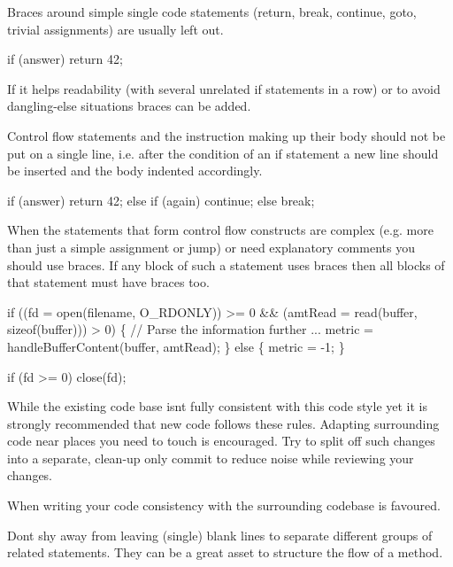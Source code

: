 Braces around simple single code statements (return, break, continue, goto, trivial assignments) are usually left out.


\begin{DoxyCode}
\textcolor{keywordflow}{if} (answer)
   \textcolor{keywordflow}{return} 42;
\end{DoxyCode}


If it helps readability (with several unrelated if statements in a row) or to avoid dangling-\/else situations braces can be added.

Control flow statements and the instruction making up their body should not be put on a single line, i.\+e. after the condition of an if statement a new line should be inserted and the body indented accordingly.


\begin{DoxyCode}
\textcolor{keywordflow}{if} (answer)
   \textcolor{keywordflow}{return} 42;
\textcolor{keywordflow}{else} \textcolor{keywordflow}{if} (again)
   \textcolor{keywordflow}{continue};
\textcolor{keywordflow}{else}
   \textcolor{keywordflow}{break};
\end{DoxyCode}


When the statements that form control flow constructs are complex (e.\+g. more than just a simple assignment or jump) or need explanatory comments you should use braces. If any block of such a statement uses braces then all blocks of that statement must have braces too.


\begin{DoxyCode}
\textcolor{keywordflow}{if} ((fd = open(filename, O\_RDONLY)) >= 0 &&
   (amtRead = read(buffer, \textcolor{keyword}{sizeof}(buffer))) > 0) \{
   \textcolor{comment}{// Parse the information further ...}
   metric = handleBufferContent(buffer, amtRead);
\} \textcolor{keywordflow}{else} \{
   metric = -1;
\}

\textcolor{keywordflow}{if} (fd >= 0)
   close(fd);
\end{DoxyCode}


While the existing code base isn\textquotesingle{}t fully consistent with this code style yet it is strongly recommended that new code follows these rules. Adapting surrounding code near places you need to touch is encouraged. Try to split off such changes into a separate, clean-\/up only commit to reduce noise while reviewing your changes.

When writing your code consistency with the surrounding codebase is favoured.

Don\textquotesingle{}t shy away from leaving (single) blank lines to separate different groups of related statements. They can be a great asset to structure the flow of a method.


